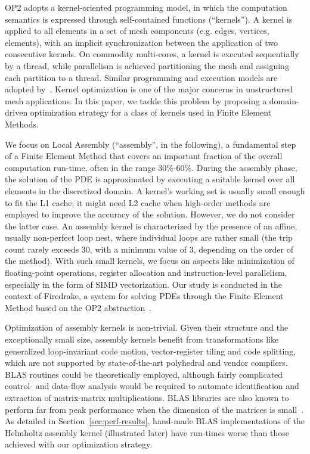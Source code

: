 \documentclass[conference]{IEEEtran}
\begin{document}
OP2 adopts a kernel-oriented programming model, in which the computation semantics is expressed through self-contained functions (``kernels''). A kernel is applied to all elements in a set of mesh components (e.g. edges, vertices, elements), with an implicit synchronization between the application of two consecutive kernels. On commodity multi-cores, a kernel is executed sequentially by a thread, while parallelism is achieved partitioning the mesh and assigning each partition to a thread. Similar programming and execution models are adopted by~\cite{Fenics, fluidity, lizst}. Kernel optimization is one of the major concerns in unstructured mesh applications. In this paper, we tackle this problem by proposing a domain-driven optimization strategy for a class of kernels used in Finite Element Methods.

We focus on Local Assembly (``assembly'', in the following), a fundamental step of a Finite Element Method that covers an important fraction of the overall computation run-time, often in the range 30$\%$-60$\%$. During the assembly phase, the solution of the PDE is approximated by executing a suitable kernel over all elements in the discretized domain. A kernel's working set is usually small enough to fit the L1 cache; it might need L2 cache when high-order methods are employed to improve the accuracy of the solution. However, we do not consider the latter case. An assembly kernel is characterized by the presence of an affine, usually non-perfect loop nest, where individual loops are rather small (the trip count rarely exceeds 30, with a minimum value of 3, depending on the order of the method). With such small kernels, we focus on aspects like minimization of floating-point operations, register allocation and instruction-level parallelism, especially in the form of SIMD vectorization. Our study is conducted in the context of Firedrake, a system for solving PDEs through the Finite Element Method based on the OP2 abstraction~\cite{firedrake}.

Optimization of assembly kernels is non-trivial. Given their structure and the exceptionally small size, assembly kernels benefit from transformations like generalized loop-invariant code motion, vector-register tiling and code splitting, which are not supported by state-of-the-art polyhedral and vendor compilers. BLAS routines could be theoretically employed, although fairly complicated control- and data-flow analysis would be required to automate identification and extraction of matrix-matrix multiplications. BLAS libraries are also known to perform far from peak performance when the dimension of the matrices is small~\cite{nek5000}. As detailed in Section~\ref{sec:perf-results}, hand-made BLAS implementations of the Helmholtz assembly kernel (illustrated later) have run-times worse than those achieved with our optimization strategy. 
\end{document}

